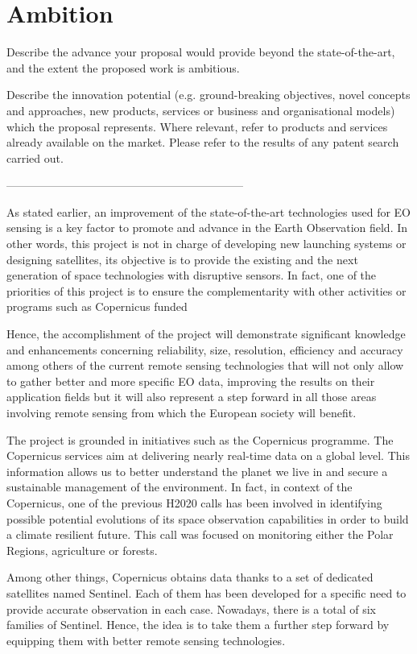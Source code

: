 \section{Ambition}

Describe the advance your proposal would provide beyond the state-of-the-art, and the extent the proposed work is ambitious.

Describe the innovation potential (e.g. ground-breaking objectives, novel concepts and approaches, new products, services or business and organisational models) which the proposal represents. Where relevant, refer to products and services already available on the market. Please refer to the results of any patent search carried out.

---------------------------------------------------------------

As stated earlier, an improvement of the state-of-the-art technologies used for EO sensing is a key factor to promote and advance in the Earth Observation field. In other words, this project is not in charge of developing new launching systems or designing satellites, its objective is to provide the existing and the next generation of space technologies with disruptive sensors. In fact, one of the priorities of this project is to ensure the complementarity with other activities or programs such as Copernicus funded

Hence, the accomplishment of the project will demonstrate significant knowledge and enhancements concerning reliability, size, resolution, efficiency and accuracy among others of the current remote sensing technologies that will not only allow to gather better and more specific EO data, improving the results on their application fields but it will also represent a step forward in all those areas involving remote sensing from which the European society will benefit. 

The project is grounded in initiatives such as the Copernicus programme. The Copernicus services aim at delivering nearly real-time data on a global level. This information allows us to better understand the planet we live in and secure a sustainable management of the environment. In fact, in context of the Copernicus, one of the previous H2020 calls has been involved in identifying possible potential evolutions of its space observation capabilities in order to build a climate resilient future. This call was focused on monitoring either the Polar Regions, agriculture or forests.

Among other things, Copernicus obtains data thanks to a set of dedicated satellites named Sentinel. Each of them has been developed for a specific need to provide accurate observation in each case. Nowadays, there is a total of six families of Sentinel. Hence, the idea is to take them a further step forward by equipping them with better remote sensing technologies. 